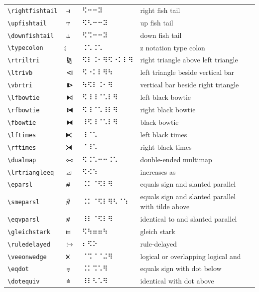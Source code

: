 \documentclass[oneside]{article}
\begin{document}
\begin{longtable}{llll}
\verb|\rightfishtail| & $\rightfishtail$ &   ⠫⠒⠒⠽   & {right fish tail} \\[2ex]
\verb|\upfishtail| & $\upfishtail$ &   ⠫⠣⠒⠒⠽   & {up fish tail} \\[2ex]
\verb|\downfishtail| & $\downfishtail$ &   ⠫⠩⠒⠒⠽   & {down fish tail} \\[2ex]
\verb|\typecolon| & $\typecolon$ &   ⠨⠡⠨⠡   & {z notation type colon} \\[2ex]
\verb|\rtriltri| & $\rtriltri$ &   ⠫⠇⠨⠂⠻⠫⠐⠅⠇⠻   & {right triangle above left triangle} \\[2ex]
\verb|\ltrivb| & $\ltrivb$ &   ⠫⠐⠅⠇⠻⠳   & {left triangle beside vertical bar} \\[2ex]
\verb|\vbrtri| & $\vbrtri$ &   ⠳⠫⠇⠨⠂⠻   & {vertical bar beside right triangle} \\[2ex]
\verb|\lfbowtie| & $\lfbowtie$ &   ⠫⠸⠸⠈⠡⠇⠻   & {left black bowtie} \\[2ex]
\verb|\rfbowtie| & $\rfbowtie$ &   ⠫⠸⠈⠡⠸⠇⠻   & {right black bowtie} \\[2ex]
\verb|\fbowtie| & $\fbowtie$ &   ⠸⠫⠸⠈⠡⠇⠻   & {black bowtie} \\[2ex]
\verb|\lftimes| & $\lftimes$ &   ⠸⠈⠡   & {left black times} \\[2ex]
\verb|\rftimes| & $\rftimes$ &   ⠈⠸⠡   & {right black times} \\[2ex]
\verb|\dualmap| & $\dualmap$ &   ⠫⠨⠡⠒⠒⠨⠡   & {double-ended multimap} \\[2ex]
\verb|\lrtriangleeq| & $\lrtriangleeq$ &   ⠫⠪⠱   & {increases as} \\[2ex]
\verb|\eparsl| & $\eparsl$ &   ⠨⠅⠈⠫⠇⠻   & {equals sign and slanted parallel} \\[2ex]
\verb|\smeparsl| & $\smeparsl$ &   ⠨⠅⠈⠫⠇⠻⠣⠈⠱   & {equals sign and slanted parallel with tilde above} \\[2ex]
\verb|\eqvparsl| & $\eqvparsl$ &   ⠸⠇⠈⠫⠇⠻   & {identical to and slanted parallel} \\[2ex]
\verb|\gleichstark| & $\gleichstark$ &   ⠫⠳⠶⠶⠳   & {gleich stark} \\[2ex]
\verb|\ruledelayed| & $\ruledelayed$ &   ⠆⠫⠕   & {rule-delayed} \\[2ex]
\verb|\veeonwedge| & $\veeonwedge$ &   ⠈⠩⠈⠈⠬⠻   & {logical or overlapping logical and} \\[2ex]
\verb|\eqdot| & $\eqdot$ &   ⠨⠅⠩⠡⠻   & {equals sign with dot below} \\[2ex]
\verb|\dotequiv| & $\dotequiv$ &   ⠸⠇⠣⠡⠻   & {identical with dot above} \\[2ex]

\end{longtable}
\end{document}
